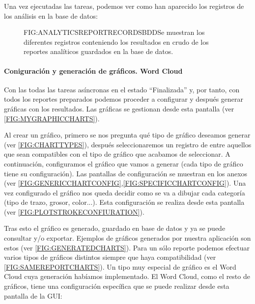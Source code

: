  Una vez ejecutadas las tareas, podemos ver como han aparecido los registros de los análisis en la base de datos:
 
  \begin{figure}[Registros de los reportes analíticos en base de datos]{FIG:ANALYTICSREPORTRECORDSBDD}{Se muestran los diferentes registros conteniendo los resultados en crudo de los reportes analíticos guardados en la base de datos.}
	 \quad
	 \quad
	 \quad
 \end{figure}
 
\paragraph{Coniguración y generación de gráficos. Word Cloud}
Con las todas las tareas asíncronas en el estado ``Finalizada'' y, por tanto, con todos los reportes preparados podemos proceder a configurar y después generar gráficas con los resultados. Las gráficas se gestionan desde esta pantalla (ver \ref{FIG:MYGRAPHICCHARTS}). 

Al crear un gráfico, primero se nos pregunta qué tipo de gráfico deseamos generar (ver \ref{FIG:CHARTTYPES}), después seleccionaremos un registro de entre aquellos que sean compatibles con el tipo de gráfico que acabamos de seleccionar. A continuación, configuramos el gráfico que vamos a generar (cada tipo de gráfico tiene su configuración). Las pantallas de configuración se muestran en los anexos (ver \ref{FIG:GENERICCHARTCONFIG},\ref{FIG:SPECIFICCHARTCONFIG}). Una vez configurado el gráfico nos queda decidir como se va a dibujar cada categoría (tipo de trazo, grosor, color...). Esta configuración se realiza desde esta pantalla (ver \ref{FIG:PLOTSTROKECONFIURATION}).

Tras esto el gráfico es generado, guardado en base de datos y ya se puede consultar y/o exportar. Ejemplos de gráficos generados por nuestra aplicación son estos (ver \ref{FIG:GENERATEDCHARTS}). Para un sólo reporte podemos efectuar varios tipos de gráficos distintos siempre que haya compatibilidad (ver \ref{FIG:SAMEREPORTCHARTS}).
\newpage
Un tipo muy especial de gráfico es el Word Cloud cuya generación habíamos implementado. El Word Cloud, como el resto de gráficos, tiene una configuración específica que se puede realizar desde esta pantalla de la GUI:

